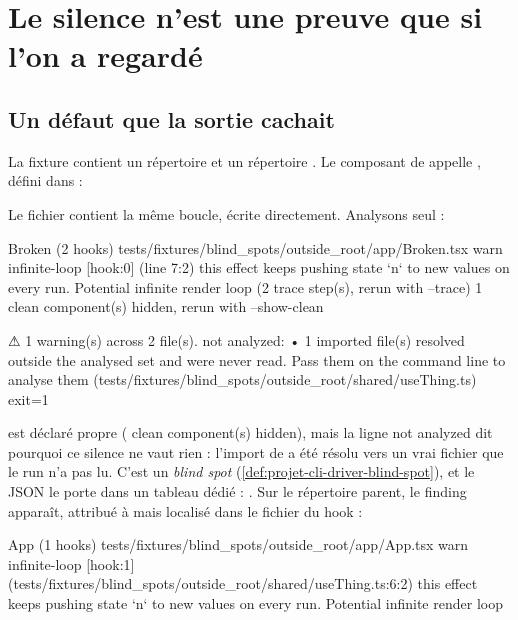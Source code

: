 \section{Le silence n'est une preuve que si l'on a regardé}
\label{sec:tests-corpus-angles-morts}

\subsection{Un défaut que la sortie cachait}

La fixture  contient un répertoire  et un répertoire . Le composant  de  appelle , défini dans  :


Le fichier  contient la même boucle, écrite directement. Analysons  seul :

\begin{sortie}
  Broken  (2 hooks)  tests/fixtures/blind_spots/outside_root/app/Broken.tsx
    warn   infinite-loop  [hook:0]  (line 7:2)  this effect keeps pushing state `n` to new values on every run. Potential infinite render loop
       (2 trace step(s), rerun with --trace)
   1 clean component(s) hidden, rerun with --show-clean

⚠  1 warning(s) across 2 file(s).
   not analyzed:
     • 1 imported file(s) resolved outside the analysed set and were never read. Pass them on the command line to analyse them (tests/fixtures/blind_spots/outside_root/shared/useThing.ts)
exit=1
\end{sortie}

 est déclaré propre ( clean component(s) hidden\fg{}), mais la ligne \og not analyzed\fg{} dit pourquoi ce silence ne vaut rien : l'import de  a été résolu vers un vrai fichier que le run n'a pas lu. C'est un \emph{blind spot} (\cref{def:projet-cli-driver-blind-spot}), et le JSON le porte dans un tableau dédié : . Sur le répertoire parent, le finding apparaît, attribué à  mais localisé dans le fichier du hook :

\begin{sortie}
  App  (1 hooks)  tests/fixtures/blind_spots/outside_root/app/App.tsx
    warn   infinite-loop  [hook:1]  (tests/fixtures/blind_spots/outside_root/shared/useThing.ts:6:2)  this effect keeps pushing state `n` to new values on every run. Potential infinite render loop
\end{sortie}

